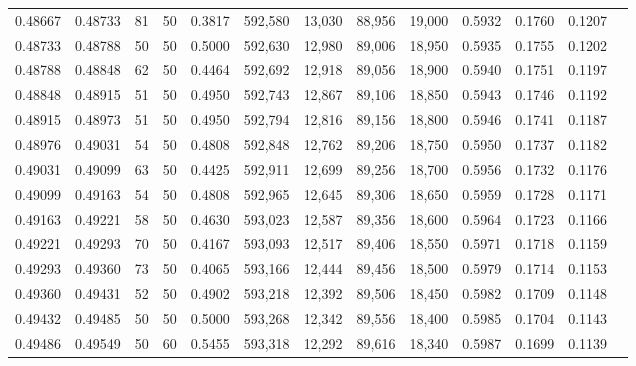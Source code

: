\begin{tabular}{rrrrrrrrrrrrr}
0.48667 & 0.48733 &    81 &  50 &                                     0.3817 & 592,580 &  13,030 &  88,956 &  19,000 & 0.5932 & 0.1760 & 0.1207 \\
0.48733 & 0.48788 &    50 &  50 &                                     0.5000 & 592,630 &  12,980 &  89,006 &  18,950 & 0.5935 & 0.1755 & 0.1202 \\
0.48788 & 0.48848 &    62 &  50 &                                     0.4464 & 592,692 &  12,918 &  89,056 &  18,900 & 0.5940 & 0.1751 & 0.1197 \\
0.48848 & 0.48915 &    51 &  50 &                                     0.4950 & 592,743 &  12,867 &  89,106 &  18,850 & 0.5943 & 0.1746 & 0.1192 \\
0.48915 & 0.48973 &    51 &  50 &                                     0.4950 & 592,794 &  12,816 &  89,156 &  18,800 & 0.5946 & 0.1741 & 0.1187 \\
0.48976 & 0.49031 &    54 &  50 &                                     0.4808 & 592,848 &  12,762 &  89,206 &  18,750 & 0.5950 & 0.1737 & 0.1182 \\
0.49031 & 0.49099 &    63 &  50 &                                     0.4425 & 592,911 &  12,699 &  89,256 &  18,700 & 0.5956 & 0.1732 & 0.1176 \\
0.49099 & 0.49163 &    54 &  50 &                                     0.4808 & 592,965 &  12,645 &  89,306 &  18,650 & 0.5959 & 0.1728 & 0.1171 \\
0.49163 & 0.49221 &    58 &  50 &                                     0.4630 & 593,023 &  12,587 &  89,356 &  18,600 & 0.5964 & 0.1723 & 0.1166 \\
0.49221 & 0.49293 &    70 &  50 &                                     0.4167 & 593,093 &  12,517 &  89,406 &  18,550 & 0.5971 & 0.1718 & 0.1159 \\
0.49293 & 0.49360 &    73 &  50 &                                     0.4065 & 593,166 &  12,444 &  89,456 &  18,500 & 0.5979 & 0.1714 & 0.1153 \\
0.49360 & 0.49431 &    52 &  50 &                                     0.4902 & 593,218 &  12,392 &  89,506 &  18,450 & 0.5982 & 0.1709 & 0.1148 \\
0.49432 & 0.49485 &    50 &  50 &                                     0.5000 & 593,268 &  12,342 &  89,556 &  18,400 & 0.5985 & 0.1704 & 0.1143 \\
0.49486 & 0.49549 &    50 &  60 &                                     0.5455 & 593,318 &  12,292 &  89,616 &  18,340 & 0.5987 & 0.1699 & 0.1139 \\

\end{tabular}
